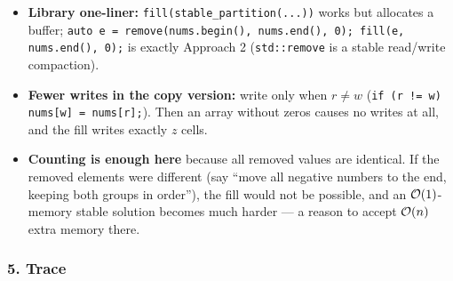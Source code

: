 \begin{tricksbox}
\begin{itemize}[leftmargin=*]
    \item \textbf{Library one-liner:} \texttt{fill(stable\_partition(...))} works but allocates a buffer; \texttt{auto e = remove(nums.begin(), nums.end(), 0); fill(e, nums.end(), 0);} is exactly Approach 2 (\texttt{std::remove} is a stable read/write compaction).
    \item \textbf{Fewer writes in the copy version:} write only when $r \ne w$ (\texttt{if (r != w) nums[w] = nums[r];}). Then an array without zeros causes no writes at all, and the fill writes exactly $z$ cells.
    \item \textbf{Counting is enough here} because all removed values are identical. If the removed elements were different (say ``move all negative numbers to the end, keeping both groups in order''), the fill would not be possible, and an $\mathcal{O}(1)$-memory stable solution becomes much harder --- a reason to accept $\mathcal{O}(n)$ extra memory there.
\end{itemize}
\end{tricksbox}

\subsubsection*{5. Trace}

